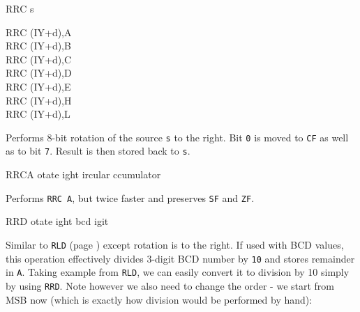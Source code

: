 \documentclass[12pt,twoside,openright,a4paper]{book}
\begin{document}
\begin{basedescript}{
	\desclabelstyle{\multilinelabel}
	\desclabelwidth{3cm}}
\begin{DetailItem}{RRC s}
\begin{DetailVariants}
			\columnbreak
			RRC (IY+d),A\UNDOC\\
			RRC (IY+d),B\UNDOC\\
			RRC (IY+d),C\UNDOC\\
			RRC (IY+d),D\UNDOC\\
			RRC (IY+d),E\UNDOC\\
			RRC (IY+d),H\UNDOC\\
			RRC (IY+d),L\UNDOC
		\end{DetailVariants}

		Performs 8-bit rotation of the source {\tt s} to the right. Bit {\tt 0} is moved to {\tt CF} as well as to bit {\tt 7}. Result is then stored back to {\tt s}.

		\begin{DetailEffects}[p]
			\FlagsRRCr
		\end{DetailEffects}
						
		\begin{DetailTiming}
		\end{DetailTiming}

	\end{DetailItem}

	\begin{DetailItem}{RRCA}
		{otate ight ircular ccumulator}
		{\SymRRC{A}}

		Performs {\tt RRC A}, but twice faster and preserves {\tt SF} and {\tt ZF}.

		\begin{DetailEffects}
			\FlagsRRCA
		\end{DetailEffects}
						
		\begin{DetailTiming}
			\DetailTime{1}{4}
		\end{DetailTiming}

	\end{DetailItem}

	\begin{DetailItem}{RRD}
		{otate ight bcd igit}
		{\SymRRD}
		
		Similar to {\tt RLD} (page \pageref{DetailRefRLD}) except rotation is to the right. If used with BCD values, this operation effectively divides 3-digit BCD number by {\tt 10} and stores remainder in {\tt A}. Taking example from {\tt RLD}, we can easily convert it to division by 10 simply by using {\tt RRD}. Note however we also need to change the order - we start from MSB now (which is exactly how division would be performed by hand):


\end{DetailItem}
\end{basedescript}
\end{document}
